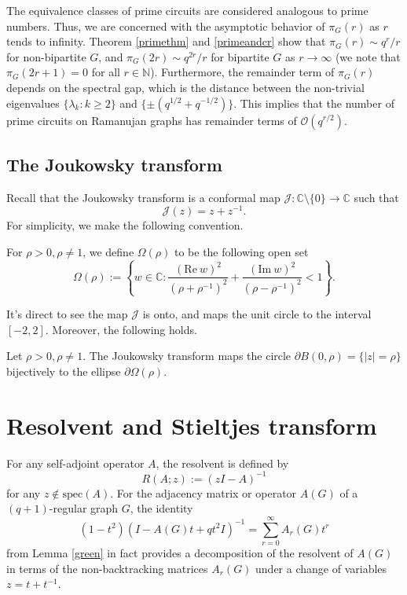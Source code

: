 \documentclass{article}
\begin{document}
The equivalence classes of prime circuits are considered analogous to prime numbers. Thus, we are concerned with the asymptotic behavior of $\pi_{G}(r)$ as $r$ tends to infinity. Theorem \ref{primethm} and \eqref{primeandcr} show that $\pi_{G}(r)\sim q^{r}/r$ for non-bipartite $G$, and $\pi_{G}(2r)\sim q^{2r}/r$ for bipartite $G$ as $r \to \infty$ (we note that $\pi_{G}(2r+1)=0$ for all $r \in \mathbb{N}$). Furthermore, the remainder term of $\pi_{G}(r)$ depends on the spectral gap, which is the distance between the non-trivial eigenvalues $\{\lambda_{k}: k\geq 2\}$ and $\{\pm \left(q^{1/2}+q^{-1/2}\right)\}$. This implies that the number of prime circuits on Ramanujan graphs has remainder terms of $\mathcal{O}(q^{r/2})$.

\subsection{The Joukowsky transform}
Recall that the Joukowsky transform is a conformal map $\mathcal{J}: \mathbb{C} \setminus \{0\} \rightarrow \mathbb{C}$ such that 
$$\mathcal{J}(z)=z+z^{-1}.$$
For simplicity, we make the following convention.
\begin{definition}\label{interiorellipse}
    For $\rho>0, \rho\neq 1$, we define $\Omega(\rho)$ to be the following open set 
    $$\Omega(\rho):=\left\{w\in \mathbb{C}:\frac{(\mathrm{Re}\ w)^2}{(\rho+\rho^{-1})^2}+\frac{(\mathrm{Im}\ w)^2}{(\rho-\rho^{-1})^2}<1\right\}.$$
\end{definition}

It's direct to see the map $\mathcal{J}$ is onto, and maps the unit circle to the interval $[-2,2]$.
Moreover, the following holds.
\begin{lemma}
    Let $\rho>0, \rho \neq 1$. The Joukowsky transform maps the circle $\partial B(0,\rho)=\{|z|=\rho\}$ bijectively to the ellipse $\partial\Omega(\rho)$.
\end{lemma}


\section{Resolvent and Stieltjes transform}

For any self-adjoint operator $A$, the resolvent is defined by
$$R(A; z):=(zI-A)^{-1}$$ for any $z\notin \mathrm{spec}(A)$. For the adjacency matrix or operator $A(G)$ of a $(q+1)$-regular graph $G$, the identity
$$(1-t^2) (I-A(G)t+qt^2I)^{-1}=\sum_{r=0}^{\infty}A_{r}(G)t^r$$
from Lemma \ref{green} in fact provides a decomposition of the resolvent of $A(G)$ in terms of the non-backtracking matrices $A_r(G)$ under a change of variables $z=t+{t}^{-1}$. 
\end{document}
